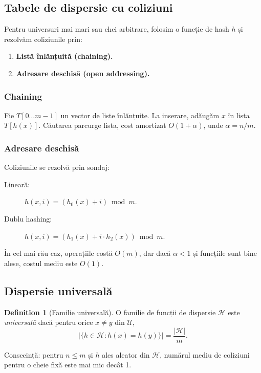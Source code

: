 \documentclass[11pt,a4paper]{article}
\theoremstyle{definition}
\newtheorem{definition}{Definition}[section]
\theoremstyle{plain}
\theoremstyle{remark}
\begin{document}
\subsection{Tabele de dispersie cu coliziuni}
\label{subsec:coliziuni}
Pentru universuri mai mari sau chei arbitrare, folosim o funcție de hash $h$ și rezolvăm coliziunile prin:
\begin{enumerate}
  \item \textbf{Listă înlănțuită (chaining).}
  \item \textbf{Adresare deschisă (open addressing).}
\end{enumerate}

\subsubsection{Chaining}
Fie $T[0\dots m-1]$ un vector de liste înlănțuite. La inserare, adăugăm $x$ în lista $T[h(x)]$. Căutarea parcurge lista, cost amortizat $O(1 + \alpha)$, unde $\alpha = n/m$.

\subsubsection{Adresare deschisă}
Coliziunile se rezolvă prin sondaj:\\
\begin{description}
  \item[Lineară:] $h(x,i) = (h_0(x) + i) \bmod m$.
  \item[Dublu hashing:] $h(x,i) = (h_1(x) + i\cdot h_2(x)) \bmod m$.
\end{description}
În cel mai rău caz, operațiile costă $O(m)$, dar dacă $\alpha < 1$ și funcțiile sunt bine alese, costul mediu este $O(1)$.

\subsection{Dispersie universală}
\label{subsec:dispersie-universala}
\begin{definition}[Familie universală]
O familie de funcții de dispersie $\mathcal{H}$ este \emph{universală} dacă pentru orice $x\neq y$ din $\mathcal{U}$,
$$\bigl|\{h\in\mathcal{H} : h(x)=h(y)\}\bigr| = \frac{|\mathcal{H}|}{m}.$$
\end{definition}
Consecință: pentru $n\le m$ și $h$ ales aleator din $\mathcal{H}$, numărul mediu de coliziuni pentru o cheie fixă este mai mic decât 1.
\end{document}
